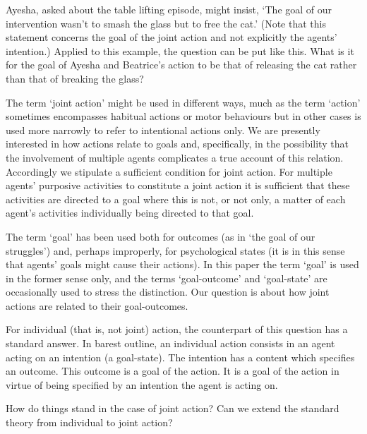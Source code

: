\documentclass[12pt,a4paper]{extarticle}
\begin{document}
Ayesha, asked about the table lifting episode, might insist, `The goal of our intervention wasn't to smash the glass but to free the cat.'  (Note that this statement concerns the goal of the joint action and not explicitly the agents' intention.)  Applied to this example, the question can be put like this.  What is it for the goal of Ayesha and Beatrice's action to be that of releasing the cat rather than that of breaking the glass?

The term `joint action' might be used in different ways, much as the term `action' sometimes encompasses habitual actions or motor behaviours but in other cases is used more narrowly to refer to intentional actions only.  We are presently interested in how actions relate to goals and, specifically, in the possibility that the involvement of multiple agents complicates a true account of this relation.  Accordingly we stipulate a sufficient condition for joint action.  For multiple agents' purposive activities to constitute a joint action it is sufficient that these activities are directed to a goal where this is not, or not only, a matter of each agent's activities individually being directed to that goal.   

The term `goal' has been used both for outcomes (as in `the goal of our struggles') and, perhaps improperly, for psychological states (it is in this sense that agents' goals might cause their actions).  In this paper the term `goal' is used in the former sense only, and the terms `goal-outcome' and `goal-state' are occasionally used to stress the distinction.  Our question is about how joint actions are related to their goal-outcomes.  

For individual (that is, not joint) action, the counterpart of this question has a standard answer.  In barest outline, an individual action consists in an agent acting on an intention (a goal-state).  The intention has a content which specifies an outcome.
This outcome is a goal of the action.
It is a goal of the action in virtue of being specified by an intention the agent is acting on. 


How do things stand in the case of joint action?  Can we extend the standard theory from individual to joint action?  
\end{document}
